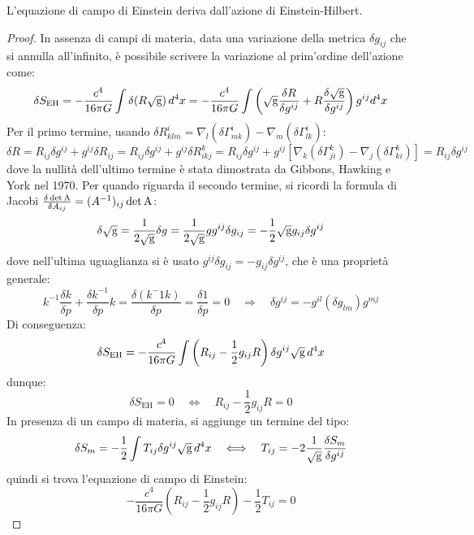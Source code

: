 \begin{proposition}
	L'equazione di campo di Einstein deriva dall'azione di Einstein-Hilbert.
\end{proposition}
\begin{proof}
	In assenza di campi di materia, data una variazione della metrica $ \delta g_{ij} $ che si annulla all'infinito, è possibile scrivere la variazione al prim'ordine dell'azione come:
	\begin{equation*}
		\delta S_{\text{EH}} = - \frac{c^4}{16\pi G} \int \delta (R\sqrt{\mathbf{\text{g}}}) \,d^4x = - \frac{c^4}{16\pi G} \int \left( \sqrt{\mathbf{\text{g}}} \frac{\delta R}{\delta g^{ij}} + R \frac{\delta \sqrt{\mathbf{\text{g}}}}{\delta g^{ij}} \right) g^{ij} d^4x
	\end{equation*}
	Per il primo termine, usando $ \delta R^i_{klm} = \nabla_l (\delta \Gamma^i_{mk}) - \nabla_m (\delta \Gamma^i_{lk}) $:
	\begin{equation*}
		\delta R = R_{ij} \delta g^{ij} + g^{ij} \delta R_{ij} = R_{ij} \delta g^{ij} + g^{ij} \delta R^k_{ikj} = R_{ij} \delta g^{ij} + g^{ij} \left[ \nabla_k (\delta \Gamma^k_{ji}) - \nabla_j (\delta \Gamma^k_{ki}) \right] = R_{ij} \delta g^{ij}
	\end{equation*}
	dove la nullità dell'ultimo termine è stata dimostrata da Gibbons, Hawking e York nel 1970. Per quando riguarda il secondo termine, si ricordi la formula di Jacobi $ \frac{\delta \det \mathbf{\text{A}}}{\delta A_{ij}} = (A^{-1})_{ij} \det \mathbf{\text{A}} $:
	\begin{equation*}
		\delta \sqrt{\mathbf{\text{g}}} = \frac{1}{2\sqrt{\mathbf{\text{g}}}} \delta g = \frac{1}{2\sqrt{\mathbf{\text{g}}}} g g^{ij} \delta g_{ij} = - \frac{1}{2} \sqrt{\mathbf{\text{g}}} g_{ij} \delta g^{ij}
	\end{equation*}
	dove nell'ultima uguaglianza si è usato $ g^{ij} \delta g_{ij} = - g_{ij} \delta g^{ij} $, che è una proprietà generale:
	\begin{equation*}
		k^{-1} \frac{\delta k}{\delta p} + \frac{\delta k^{-1}}{\delta p} k = \frac{\delta (k^-1 k)}{\delta p} = \frac{\delta 1}{\delta p} = 0 \quad\Longrightarrow\quad \delta g^{ij} = - g^{il} (\delta g_{lm}) g^{mj}
	\end{equation*}
	Di conseguenza:
	\begin{equation*}
		\delta S_{\text{EH}} = - \frac{c^4}{16\pi G} \int \left( R_{ij} - \frac{1}{2} g_{ij} R \right) \delta g^{ij} \sqrt{\mathbf{\text{g}}} \,d^4x
	\end{equation*}
	dunque:
	\begin{equation*}
		\delta S_{\text{EH}} = 0 \quad\Longleftrightarrow\quad R_{ij} - \frac{1}{2} g_{ij} R = 0
	\end{equation*}
	In presenza di un campo di materia, si aggiunge un termine del tipo:
	\begin{equation*}
		\delta S_m = - \frac{1}{2} \int T_{ij} \delta g^{ij} \sqrt{\mathbf{\text{g}}} \,d^4x \quad\Longleftrightarrow\quad T_{ij} = - 2 \frac{1}{\sqrt{\mathbf{\text{g}}}} \frac{\delta S_m}{\delta g^{ij}}
	\end{equation*}
	quindi si trova l'equazione di campo di Einstein:
	\begin{equation*}
		- \frac{c^4}{16\pi G} \left( R_{ij} - \frac{1}{2} g_{ij} R \right) - \frac{1}{2} T_{ij} = 0
	\end{equation*}
\end{proof}










